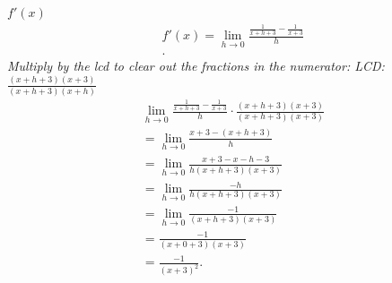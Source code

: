 \documentclass{report}
\begin{document}
        \bigbreak \noindent 
        \textbf{$f\prime(x)$}
        \begin{align*}
            f\prime(x) = \lim\limits_{h \to 0}{ \frac{ \frac{1}{x+h+3} - \frac{1}{x+3}}{h}} \\ 
        .\end{align*}
        \bigbreak \noindent 
        \textit{Multiply by the lcd to clear out the fractions in the numerator: LCD: $ \frac{(x+h+3)(x+3)}{(x+h+3)(x+h)}$}
        \begin{align*}
            \lim\limits_{h \to 0}{\frac{ \frac{1}{x+h+3} - \frac{1}{x+3}}{h}} \cdot \frac{(x+h+3)(x+3)}{(x+h+3)(x+3)} \\
            = \lim\limits_{h \to 0}{ \frac{x+3 - (x+h+3)}{h}} \\ 
            = \lim\limits_{h \to 0}{ \frac{x+3-x-h-3}{h(x+h+3)(x+3)}} \\ 
            = \lim\limits_{h \to 0}{ \frac{-h}{h(x+h+3)(x+3)}} \\ 
            = \lim\limits_{h \to 0}{ \frac{-1}{(x+h+3)(x+3)}} \\
            = \frac{-1}{(x+0+3)(x+3)} \\ 
            = \frac{-1}{(x+3)^2}
        .\end{align*}
\end{document}
